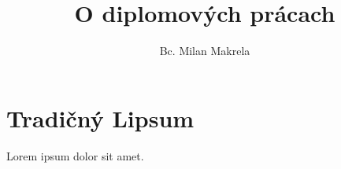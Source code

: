 \documentclass{rnthesis}
\title{O diplomových prácach}
\author{Bc. Milan Makrela}
\begin{document}
\maketitle
\newpage
\chapter{Tradičný Lipsum}
Lorem ipsum dolor sit amet.
\end{document}
